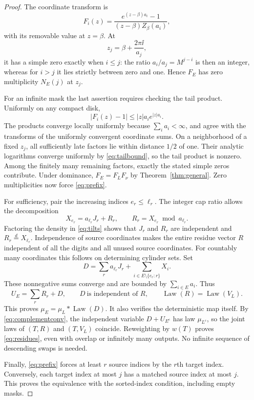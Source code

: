 \documentclass[11pt,a4paper]{article}
\theoremstyle{remark}\newtheorem*{ednote}{Editorial note (ProveIt, 2026-10-01)}
\newcommand{\Law}{\operatorname{Law}}\newcommand{\ind}{\mathbf1}
\begin{document}
\begin{proof}
The coordinate transform is
\[
 F_i(z)=\frac{e^{(z-\beta)a_i}-1}{(z-\beta)Z_\beta(a_i)},
\]
with its removable value at $z=\beta$. At
\[
 z_j=\beta+\frac{2\pi\ii}{a_j},
\]
it has a simple zero exactly when $i\le j$: the ratio $a_i/a_j=M^{j-i}$ is then an integer, whereas for $i>j$ it lies strictly between zero and one. Hence $F_E$ has zero multiplicity $N_E(j)$ at $z_j$.

For an infinite mask the last assertion requires checking the tail product. Uniformly on any compact disk,
\begin{equation}\label{eq:tailbound}
 |F_i(z)-1|\le |z|a_i e^{|z|a_i}.
\end{equation}
The products converge locally uniformly because $\sum_i a_i<\infty$, and agree with the transforms of the uniformly convergent coordinate sums. On a neighborhood of a fixed $z_j$, all sufficiently late factors lie within distance $1/2$ of one. Their analytic logarithms converge uniformly by \eqref{eq:tailbound}, so the tail product is nonzero. Among the finitely many remaining factors, exactly the stated simple zeros contribute. Under dominance, $F_E=F_LF_\nu$ by Theorem~\ref{thm:general}. Zero multiplicities now force \eqref{eq:prefix}.

For sufficiency, pair the increasing indices $e_r\le\ell_r$. The integer cap ratio allows the decomposition
\[
 X_{e_r}=a_{\ell_r}J_r+R_r,
 \qquad R_r=X_{e_r}\bmod a_{\ell_r}.
\]
Factoring the density in \eqref{eq:tilts} shows that $J_r$ and $R_r$ are independent and $R_r\stackrel d=X_{\ell_r}$. Independence of source coordinates makes the entire residue vector $R$ independent of all the digits and all unused source coordinates. For countably many coordinates this follows on determining cylinder sets. Set
\[
 D=\sum_r a_{\ell_r}J_r+
     \sum_{i\in E\setminus\{e_r:r\}}X_i.
\]
These nonnegative sums converge and are bounded by $\sum_{i\in E}a_i$. Thus
\[
 U_E=\sum_r R_r+D,
 \qquad D\ \text{is independent of }R,
 \qquad \Law(R)=\Law(V_L).
\]
This proves $\mu_E=\mu_L*\Law(D)$. It also verifies the deterministic map itself. By \eqref{eq:complementconv}, the independent variable $D+U_{E^c}$ has law $\mu_{L^c}$, so the joint laws of $(T,R)$ and $(T,V_L)$ coincide. Reweighting by $w(T)$ proves \eqref{eq:residues}, even with overlap or infinitely many outputs. No infinite sequence of descending swaps is needed.

Finally, \eqref{eq:prefix} forces at least $r$ source indices by the $r$th target index. Conversely, each target index at most $j$ has a matched source index at most $j$. This proves the equivalence with the sorted-index condition, including empty masks.
\end{proof}
\end{document}
